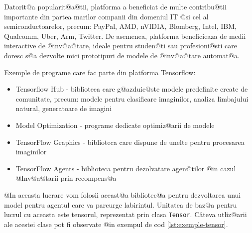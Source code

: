 Datorit@a popularit@a@tii, platforma a beneficiat de multe contribu@tii importante din partea marilor companii din domeniul IT @si cel al semiconductoarelor, precum: PayPal, AMD, nVIDIA, Blomberg, Intel, IBM, Qualcomm, Uber, Arm, Twitter. De asemenea, platforma beneficieaza de medii interactive de @inv@a@tare, ideale pentru studen@ti sau profesioni@sti care doresc s@a dezvolte mici prototipuri de modele de @inv@a@tare automat@a.

Exemple de programe care fac parte din platforma Tensorflow:
\begin{itemize}
	\item Tensorflow Hub - biblioteca care g@azduie@ste modele predefinite create de comunitate, precum: modele pentru clasificare imaginilor, analiza limbajului natural, generatoare de imagini
	\item Model Optimization - programe dedicate optimiz@arii de modele
	\item TensorFlow Graphics - biblioteca care dispune de unelte pentru procesarea imaginilor
	\item TensorFlow Agents - biblioteca pentru dezolvatare agen@tilor @in cazul @Inv@a@tarii prin recompens@a
\end{itemize}

@In aceasta lucrare vom folosii aceast@a bibliotec@a pentru dezvoltarea unui model pentru agentul care va parcurge labirintul. Unitatea de baz@a pentru lucrul cu aceasta este tensorul, reprezentat prin clasa \texttt{Tensor}. C\^ ateva utliz@arii ale acestei clase pot fi observate @in exempul de cod \ref{lst:exemple-tensor}.

